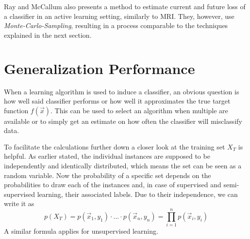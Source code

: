 Ray and McCallum \cite{RoyEtAl2001} also presents a method to estimate current and future loss of a classifier in an active learning setting, similarly to MRI. They, however, use \textit{Monte-Carlo-Sampling}, resulting in a process comparable to the techniques explained in the next section.

\section{Generalization Performance}
When a learning algorithm is used to induce a classifier, an obvious question is how well said classifier performs or how well it approximates the true target function $f(\vec{x})$. This can be used to select an algorithm when multiple are available or to simply get an estimate on how often the classifier will misclassify data.

To facilitate the calculations further down a closer look at the training set $X_T$ is helpful. As earlier stated, the individual instances are supposed to be independently and identically distributed, which means the set can be seen as a random variable. Now the probability of a specific set depends on the probabilities to draw each of the instances and, in case of supervised and semi-supervised learning, their associated labels. Due to their independence, we can write it as 
\begin{equation}
\label{eq:trainingSet}
p(X_T) = p(\vec{x}_1, y_1) \cdot ... \cdot p(\vec{x}_n, y_n) = \prod_{i=1}^{n} p(\vec{x}_i, y_i)
\end{equation}
A similar formula applies for unsupervised learning. \cite{RodriguezEtAl2013}

